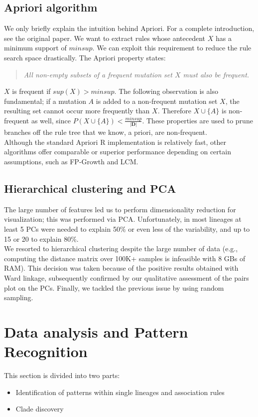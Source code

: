 \documentclass[twoside,twocolumn]{article}
\begin{document}
	\subsection{Apriori algorithm}
	We only briefly explain the intuition behind Apriori. For a complete introduction, see the original paper\cite{apriori}. We want to extract rules whose antecedent $X$ has a minimum support of $minsup$. We can exploit this requirement to reduce the rule search space drastically. The Apriori property states:
	\begin{quote}
		\textit{All non-empty subsets of a frequent mutation set $X$ must also be frequent.} 
	\end{quote}
	$X$ is frequent if $sup(X) > minsup$. The following observation is also fundamental; if a mutation $A$ is added to a non-frequent mutation set $X$, the resulting set cannot occur more frequently than $X$. Therefore $X\cup \{A\}$ is non-frequent as well, since $P(X\cup\{A\}) < \frac{minsup}{|\mathbf{D}|}$. These properties are used to prune branches off the rule tree that we know, a priori, are non-frequent. 
	\\
	Although the standard Apriori R implementation is relatively fast, other algorithms offer comparable or superior performance depending on certain assumptions, such as FP-Growth\cite{fpgrowth} and LCM\cite{lcm}. 
	\subsection{Hierarchical clustering and PCA}
	The large number of features led us to perform dimensionality reduction for visualization; this was performed via PCA. Unfortunately, in most lineages at least 5 PCs were needed to explain 50\% or even less of the variability, and up to 15 or 20 to explain 80\%. \\
	We resorted to hierarchical clustering despite the large number of data (e.g., computing the distance matrix over 100K+ samples is infeasible with 8 GBs of RAM). This decision was taken because of the positive results obtained with Ward linkage, subsequently confirmed by our qualitative assessment of the pairs plot on the PCs. Finally, we tackled the previous issue by using random sampling.
	\section{Data analysis and Pattern Recognition}
	This section is divided into two parts:
	\begin{itemize}
		\item Identification of patterns within single lineages and association rules
		\item Clade discovery
	\end{itemize}
\end{document}
